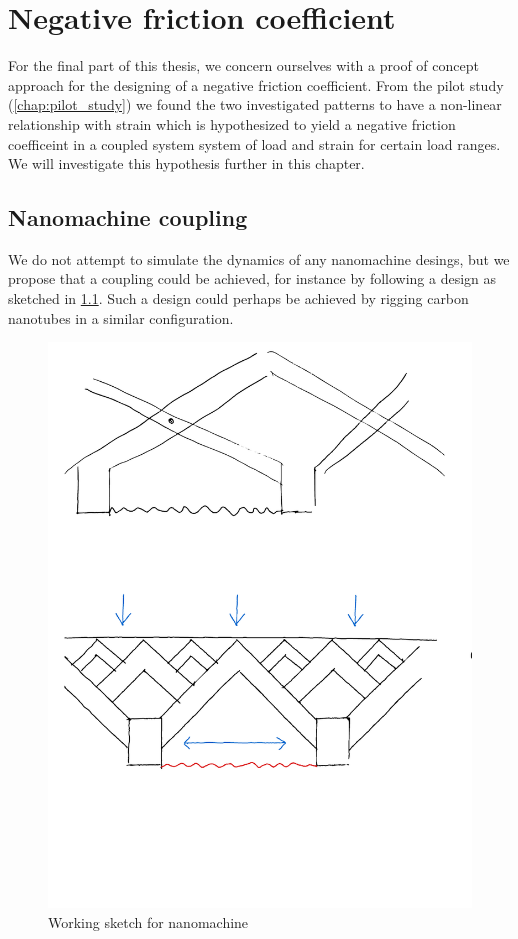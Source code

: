 \chapter{Negative friction coefficient}\label{chap:negative_coef}

For the final part of this thesis, we concern ourselves with a proof of concept approach for the designing of a negative friction coefficient. From the pilot study (\cref{chap:pilot_study}) we found the two investigated patterns to have a non-linear relationship with strain which is hypothesized to yield a negative friction coefficeint in a coupled system system of load and strain for certain load ranges. We will investigate this hypothesis further in this chapter.

\section{Nanomachine coupling}
We do not attempt to simulate the dynamics of any nanomachine desings, but we propose that a coupling could be achieved, for instance by following a design as sketched in \cref{fig:nanomachine}. Such a design could perhaps be achieved by rigging carbon nanotubes in a similar configuration. 

\begin{figure}[H]
  \centering
  \includegraphics[width=0.5\linewidth]{figures/negative_coefficient/nanomachine.pdf}
  \caption{Working sketch for nanomachine}
  \label{fig:nanomachine}
\end{figure}

